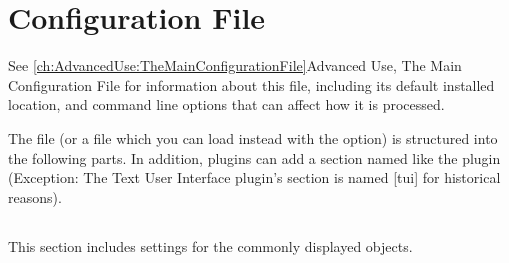 

\chapter{Configuration File}
\label{ch:ConfigurationFile}
See \ref{ch:AdvancedUse:TheMainConfigurationFile}{Advanced Use, The
Main Configuration File} for information about this file, including its
default installed location, and command line options that can
affect how it is processed.


The file  (or a file which you can load instead with
the  option) is structured into the following
parts. In addition, plugins can add a section named like the plugin
(Exception: The Text User Interface plugin's section is named [tui]
for historical reasons).

\section{}
\label{sec:config.ini:astro}

This section includes settings for the commonly displayed objects.

